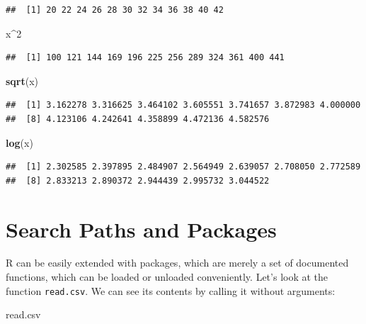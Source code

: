 \documentclass[]{book}
\newenvironment{Shaded}{\begin{snugshade}}{\end{snugshade}}
\newcommand{\KeywordTok}[1]{\textcolor[rgb]{0.13,0.29,0.53}{\textbf{#1}}}
\newcommand{\DecValTok}[1]{\textcolor[rgb]{0.00,0.00,0.81}{#1}}
\newcommand{\OperatorTok}[1]{\textcolor[rgb]{0.81,0.36,0.00}{\textbf{#1}}}
\newcommand{\NormalTok}[1]{#1}
\theoremstyle{definition}
\theoremstyle{definition}
\theoremstyle{definition}
\theoremstyle{remark}
\begin{document}
\begin{verbatim}
##  [1] 20 22 24 26 28 30 32 34 36 38 40 42
\end{verbatim}

\begin{Shaded}
\begin{Highlighting}[]
\NormalTok{x}\OperatorTok{^}\DecValTok{2}    
\end{Highlighting}
\end{Shaded}

\begin{verbatim}
##  [1] 100 121 144 169 196 225 256 289 324 361 400 441
\end{verbatim}

\begin{Shaded}
\begin{Highlighting}[]
\KeywordTok{sqrt}\NormalTok{(x)  }
\end{Highlighting}
\end{Shaded}

\begin{verbatim}
##  [1] 3.162278 3.316625 3.464102 3.605551 3.741657 3.872983 4.000000
##  [8] 4.123106 4.242641 4.358899 4.472136 4.582576
\end{verbatim}

\begin{Shaded}
\begin{Highlighting}[]
\KeywordTok{log}\NormalTok{(x)   }
\end{Highlighting}
\end{Shaded}

\begin{verbatim}
##  [1] 2.302585 2.397895 2.484907 2.564949 2.639057 2.708050 2.772589
##  [8] 2.833213 2.890372 2.944439 2.995732 3.044522
\end{verbatim}

\section{Search Paths and Packages}\label{search-paths-and-packages}

R can be easily extended with packages, which are merely a set of
documented functions, which can be loaded or unloaded conveniently.
Let's look at the function \texttt{read.csv}. We can see its contents by
calling it without arguments:

\begin{Shaded}
\begin{Highlighting}[]
\NormalTok{read.csv}
\end{Highlighting}
\end{Shaded}
\end{document}
